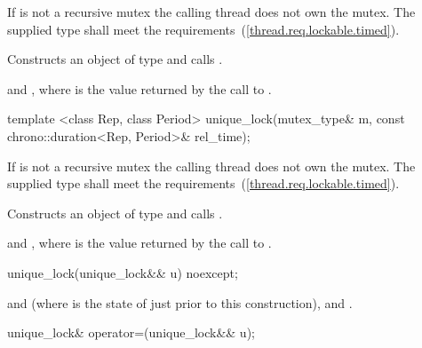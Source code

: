 \begin{itemdescr}
\pnum
\precondition If  is not a recursive mutex the calling thread
does not own the mutex. The supplied  type shall meet the
 requirements~(\ref{thread.req.lockable.timed}).

\pnum
\effects Constructs an object of type  and calls .

\pnum
\postconditions {} and ,
where  is
the value returned by the call to .
\end{itemdescr}

%
\begin{itemdecl}
template <class Rep, class Period>
  unique_lock(mutex_type& m, const chrono::duration<Rep, Period>& rel_time);
\end{itemdecl}

\begin{itemdescr}
\pnum
\precondition If  is not a recursive mutex the calling thread does not own the mutex.
The supplied  type shall meet the  requirements~(\ref{thread.req.lockable.timed}).

\pnum
\effects Constructs an object of type  and calls .

\pnum
\postconditions {} and ,
where  is the value returned by the call to .
\end{itemdescr}

%
\begin{itemdecl}
unique_lock(unique_lock&& u) noexcept;
\end{itemdecl}

\begin{itemdescr}
\pnum\postconditions {} and  (where  is the state of  just prior to this construction),   and .
\end{itemdescr}

%
%
\begin{itemdecl}
unique_lock& operator=(unique_lock&& u);
\end{itemdecl}

